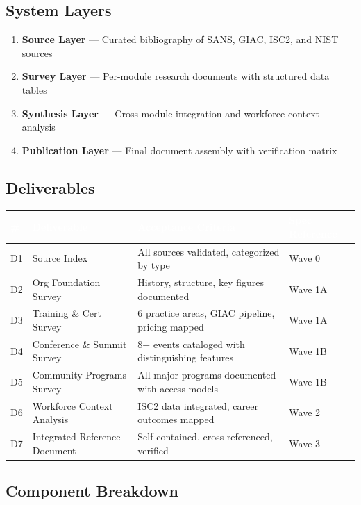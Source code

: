 \documentclass[11pt,letterpaper]{article}
\newcommand{\tableheader}[1]{\textbf{\sffamily\textcolor{white}{#1}}}
\begin{document}
\subsection{System Layers}

\begin{enumerate}[nosep]
  \item \textbf{Source Layer} --- Curated bibliography of SANS, GIAC, ISC2, and NIST sources
  \item \textbf{Survey Layer} --- Per-module research documents with structured data tables
  \item \textbf{Synthesis Layer} --- Cross-module integration and workforce context analysis
  \item \textbf{Publication Layer} --- Final document assembly with verification matrix
\end{enumerate}

\subsection{Deliverables}

\begin{center}
\begin{tabularx}{\textwidth}{C{0.8cm}L{3.5cm}XL{2.5cm}}
\toprule
{}
\tableheader{\#} & \tableheader{Deliverable} & \tableheader{Acceptance Criteria} & \tableheader{Spec Reference} \\
\midrule
D1 & Source Index & All sources validated, categorized by type & Wave 0 \\
D2 & Org Foundation Survey & History, structure, key figures documented & Wave 1A \\
D3 & Training \& Cert Survey & 6 practice areas, GIAC pipeline, pricing mapped & Wave 1A \\
D4 & Conference \& Summit Survey & 8+ events cataloged with distinguishing features & Wave 1B \\
D5 & Community Programs Survey & All major programs documented with access models & Wave 1B \\
D6 & Workforce Context Analysis & ISC2 data integrated, career outcomes mapped & Wave 2 \\
D7 & Integrated Reference Document & Self-contained, cross-referenced, verified & Wave 3 \\
\bottomrule
\end{tabularx}
\end{center}

\subsection{Component Breakdown}
\end{document}
